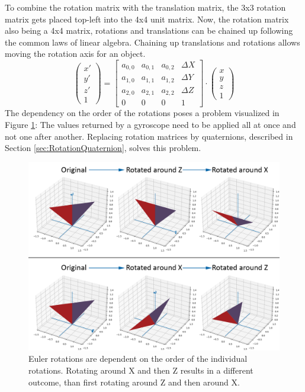 To combine the rotation matrix with the translation matrix, the 3x3 rotation matrix gets placed top-left into the 4x4 unit matrix. Now, the rotation matrix also being a 4x4 matrix, rotations and translations can be chained up following the common laws of linear algebra. Chaining up translations and rotations allows moving the rotation axis for an object.
\begin{equation*}
    \begin{pmatrix}
        x' \\
        y' \\
        z' \\
        1
    \end{pmatrix}
    =
    \begin{bmatrix}
        a_{0,0} & a_{0,1} & a_{0,2} & \Delta X \\
        a_{1,0} & a_{1,1} & a_{1,2} & \Delta Y \\
        a_{2,0} & a_{2,1} & a_{2,2} & \Delta Z \\
        0       & 0       & 0       & 1
    \end{bmatrix}
    \cdot
    \begin{pmatrix}
        x \\
        y \\
        z \\
        1
    \end{pmatrix}
\end{equation*}
The dependency on the order of the rotations poses a problem visualized in Figure \ref{im:EulerRotation}: The values returned by a gyroscope need to be applied all at once and not one after another. Replacing rotation matrices by quaternions, described in Section \ref{sec:RotationQuaternion}, solves this problem.
\begin{figure}[H]
    \centering
    \includegraphics[width=1.0\textwidth]{images/euler_rotation.png}
    \caption{Euler rotations are dependent on the order of the individual rotations. Rotating around X and then Z results in a different outcome, than first rotating around Z and then around X.}
    \label{im:EulerRotation}
\end{figure}
